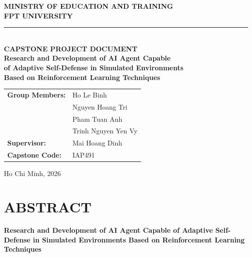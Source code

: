 \documentclass[12pt,a4paper]{report}
\begin{document}
\begin{titlepage}
\begin{center}
\textbf{\large MINISTRY OF EDUCATION AND TRAINING}\\[0.3em]
\textbf{\large FPT UNIVERSITY}\\[2em]

\rule{\linewidth}{0.5pt}\\[0.5em]

\vspace{2em}
{\LARGE\bfseries CAPSTONE PROJECT DOCUMENT}\\[2em]

\vspace{1.5em}
{\Large\bfseries Research and Development of AI Agent Capable\\[0.3em]
of Adaptive Self-Defense in Simulated Environments\\[0.3em]
Based on Reinforcement Learning Techniques}\\[3em]

\vspace{1em}
\begin{tabular}{ll}
\textbf{Group Members:} & Ho Le Binh \\ 
                        & Nguyen Hoang Tri \\
                        & Pham Tuan Anh \\
                        & Trinh Nguyen Yen Vy \\[1.5em]
\textbf{Supervisor:}    & Mai Hoang Dinh \\[1.5em]
\textbf{Capstone Code:} & IAP491 \\
\end{tabular}

\vfill
{\large Ho Chi Minh, 2026}
\end{center}
\end{titlepage}

\setcounter{page}{1}

\chapter*{ABSTRACT}

\noindent\textbf{Research and Development of AI Agent Capable of Adaptive Self-Defense in Simulated Environments Based on Reinforcement Learning Techniques}
\end{document}
